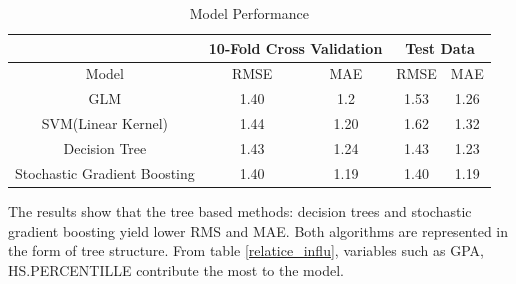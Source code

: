 \documentclass[12pt,english]{report}
\begin{document}
\begin{table}[h]
\centering
\caption{Model Performance}
\label{num_year}
\begin{tabular}{|c|c|c|c|c|}
\hline
                             & \multicolumn{2}{c|}{10-Fold Cross Validation} &
\multicolumn{2}{c|}{Test Data} \\ \hline
Model                        & RMSE                  & MAE                   &
RMSE           & MAE           \\ \hline
GLM                          & 1.40                  & 1.2                   &
1.53           & 1.26          \\ \hline
SVM(Linear Kernel)           & 1.44                  & 1.20                  &
1.62           & 1.32          \\ \hline
Decision Tree                         & 1.43                  & 1.24        &
1.43           & 1.23          \\ \hline
Stochastic Gradient Boosting & 1.40                  & 1.19                  &
1.40           & 1.19           \\ \hline
\end{tabular}
\end{table}


The results show that the tree based methods: decision trees and stochastic
gradient boosting yield lower RMS and MAE. Both algorithms are represented in
the form of tree structure. From table \ref{relatice_influ}, variables such as
GPA, HS.PERCENTILLE contribute the most to the model.
\end{document}
